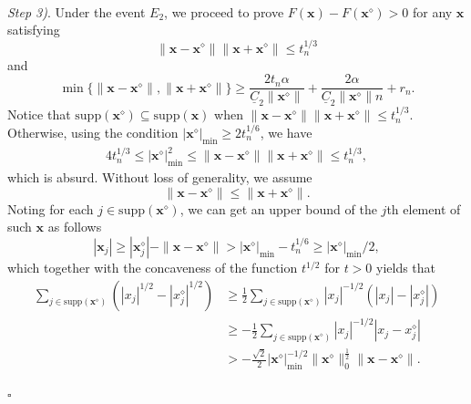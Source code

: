 \documentclass[10pt,a4paper]{amsart}
\newenvironment{proof}{{\noindent\bf Proof.}\,}{\hfill $\square$\par\mbox{}}
\begin{document}
\begin{proof}
	
	
	
	
	\textit{Step 3)}. Under the event $E_2$, we proceed to prove $F(\mathbf{x})-F(\mathbf{x}^\diamond)>0$ for any $\mathbf{x}$ satisfying $$\|\mathbf{x}-\mathbf{x}^\diamond\|\|\mathbf{x}+\mathbf{x}^\diamond\|\leq  t_n^{1/3}$$
	and 
	\begin{equation}\label{nonasyp-ub}
		\min\{\|\mathbf{x}-\mathbf{x}^\diamond\|, \|\mathbf{x}+\mathbf{x}^\diamond\|\}\geq\frac{2t_n\alpha}{\underline{C}_2\|\mathbf{x}^\diamond\|}+\frac{2\alpha}{\underline{C}_2\|\mathbf{x}^\diamond\|n}
	+r_n.
\end{equation}
Notice that $\mathrm{supp}(\mathbf{x}^\diamond)\subseteq\mathrm{supp}(\mathbf{x})$ when $\|\mathbf{x}-\mathbf{x}^\diamond\|\|\mathbf{x}+\mathbf{x}^\diamond\|\leq  t_n^{1/3}$. Otherwise, using the condition $|\mathbf{x}^\diamond|_{\mathrm{min}}\geq2t_n^{1/6}$, we have
\begin{equation}%
	\begin{aligned}
	4t_n^{1/3}\leq|\mathbf{x}^\diamond|_{\mathrm{min}}^2\leq\|\mathbf{x}-\mathbf{x}^\diamond\|\|\mathbf{x}+\mathbf{x}^\diamond\|\leq  t_n^{1/3},
	\end{aligned}\nonumber
\end{equation}
which is absurd.
	Without loss of generality, we assume $$\|\mathbf{x}-\mathbf{x}^\diamond\|\leq\|\mathbf{x}+\mathbf{x}^\diamond\|.$$
	Noting for each $j\in\mathrm{supp}(\mathbf{x}^\diamond)$, we can get an upper bound of the $j$th element of such $\mathbf{x}$ as follows
	$$|\mathbf{x}_j|\geq|\mathbf{x}_j^\diamond|-\|\mathbf{x}-\mathbf{x}^\diamond\|>|\mathbf{x}^\diamond|_{\mathrm{min}}-t_n^{1/6}
	\geq|\mathbf{x}^\diamond|_{\mathrm{min}}/2,$$
	which together with the concaveness of the function $t^{1/2}$ for $t>0$ yields that
	\begin{equation}%
		\begin{aligned}
			\sum_{j\in\mathrm{supp}(\mathbf{x}^\diamond)}(|x_j|^{1/2}-|x_j^\diamond|^{1/2})
			&\geq\frac{1}{2}\sum_{j\in\mathrm{supp}(\mathbf{x}^\diamond)}|x_j|^{-1/2}(|x_j|-|x_j^\diamond|)\\
			&\geq-\frac{1}{2}\sum_{j\in\mathrm{supp}(\mathbf{x}^\diamond)}|x_j|^{-1/2}|x_j-x_j^\diamond|\\
			&>-\frac{\sqrt{2}}{2}|\mathbf{x}^\diamond|_{\mathrm{min}}^{-1/2}\|\mathbf{x}^\diamond\|_0^{\frac{1}{2}}\|\mathbf{x}-\mathbf{x}^\diamond\|.
		\end{aligned}\nonumber
	\end{equation}
	

\end{proof}
\end{document}
